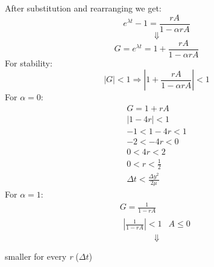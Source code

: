 \documentclass[11pt, a4paper]{article}
\begin{document}
After substitution and rearranging we get:
\begin{equation}
    e^{\lambda t}-1 = \frac{rA}{1-\alpha rA}
\end{equation}
$$\Downarrow$$
\begin{equation}
    G = e^{\lambda t} = 1+\frac{rA}{1-\alpha rA}
\end{equation}
For stability:
\begin{equation}
    |G|<1 \Rightarrow \left|1+\frac{rA}{1-\alpha rA}\right| < 1
\end{equation}
For $\alpha = 0$:
\begin{gather}
    G = 1+rA\\
    \left|1-4r\right| < 1\\
    -1< 1-4r <1\\
    -2< -4r <0\\
    0< 4r <2\\
    0< r <\frac{1}{2}\\
    \Delta t < \frac{\Delta y^2}{2\mu}
\end{gather}
For $\alpha = 1$:
\begin{gather}
    G = \frac{1}{1-rA}\\
    \begin{matrix}
        \displaystyle\left|\frac{1}{1-rA}\right|<1 & A \leq 0
    \end{matrix}
\end{gather}
$$\Downarrow$$
\begin{center}
    smaller for every \emph{r} ($\Delta t$)
\end{center}
\end{document}
